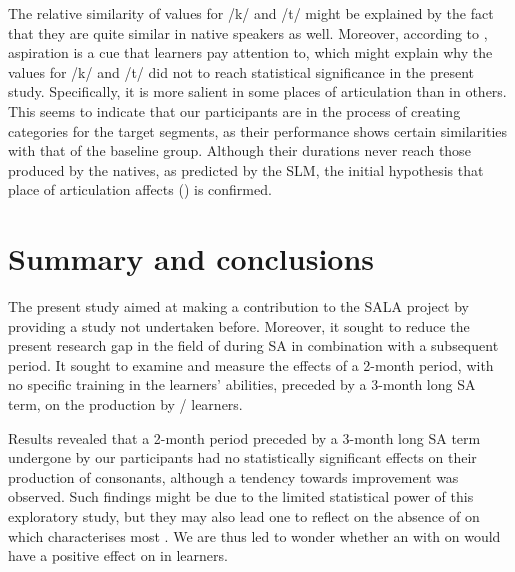 \documentclass[output=paper]{langsci/langscibook}
\begin{document}
  The relative similarity of  values for /k/ and /t/ might be explained by the fact that they are quite similar in native speakers as well. Moreover, according to \citet{AlvesZimmer2015}, aspiration is a cue that learners pay attention to, which might explain why the  values for /k/ and /t/ did not to reach statistical significance in the present study. Specifically, it is more salient in some places of articulation than in others. This seems to indicate that our participants are in the process of creating  categories for the target segments, as their performance shows certain similarities with that of the baseline group. Although their  durations never reach those produced by the natives, as predicted by the SLM, the initial hypothesis that place of articulation affects  (\citealt{YavaşWildermuth2006}) is confirmed.



\section{Summary and conclusions}


The present study aimed at making a contribution to the SALA project by providing a study not undertaken before. Moreover, it sought to reduce the present research gap in the field of    during SA in combination with a subsequent  period. It sought to examine and measure the effects of a 2-month  period, with no specific training in the learners’   abilities, preceded by a 3-month long SA term, on the  production by /  learners.



  Results revealed that a 2-month  period preceded by a 3-month long SA term undergone by our participants had no statistically significant effects on their  production of    consonants, although a tendency towards improvement was observed. Such findings might be due to the limited statistical power of this exploratory study, but they may also lead one to reflect on the absence of  on   which characterises most .  We are thus led to wonder whether an  with  on   would have a positive effect on    in  learners.
\end{document}
